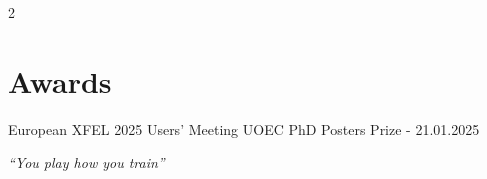 \documentclass[lighthipster]{simplehipstercv}
\begin{document}
\begin{paracol}{2}
\begin{minipage}[t]{0.3\textwidth}
\section*{Awards} 
{\small European XFEL 2025 Users' Meeting UOEC PhD Posters Prize - 21.01.2025}

\end{minipage}

\vfill

\begin{center}
    \emph{``You play how you train''}
\end{center}

\newpage
\end{paracol}
\end{document}
